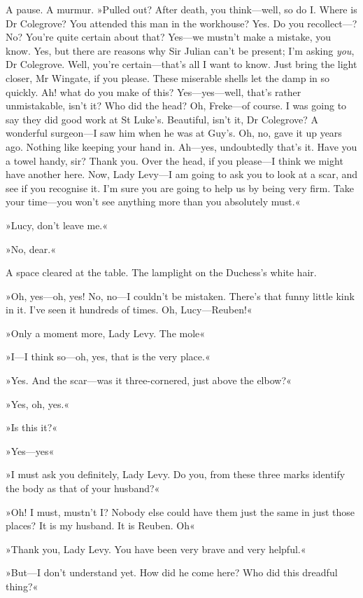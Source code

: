 A pause. A murmur. »Pulled out? After death, you think—well, so do I. Where is Dr Colegrove? You attended this man in the workhouse? Yes. Do you recollect---? No? You're quite certain about that? Yes—we mustn't make a mistake, you know. Yes, but there are reasons why Sir Julian can't be present; I'm asking \textit{you}, Dr Colegrove. Well, you're certain—that's all I want to know. Just bring the light closer, Mr Wingate, if you please. These miserable shells let the damp in so quickly. Ah! what do you make of this? Yes—yes---well, that's rather unmistakable, isn't it? Who did the head? Oh, Freke—of course. I was going to say they did good work at St Luke's. Beautiful, isn't it, Dr Colegrove? A wonderful surgeon—I saw him when he was at Guy's. Oh, no, gave it up years ago. Nothing like keeping your hand in. Ah—yes, undoubtedly that's it. Have you a towel handy, sir? Thank you. Over the head, if you please—I think we might have another here. Now, Lady Levy—I am going to ask you to look at a scar, and see if you recognise it. I'm sure you are going to help us by being very firm. Take your time—you won't see anything more than you absolutely must.«

»Lucy, don't leave me.«

»No, dear.«

A space cleared at the table. The lamplight on the Duchess's white hair.

»Oh, yes—oh, yes! No, no—I couldn't be mistaken. There's that funny little kink in it. I've seen it hundreds of times. Oh, Lucy—Reuben!«

»Only a moment more, Lady Levy. The mole\longdash«

»I—I think so—oh, yes, that is the very place.«

»Yes. And the scar—was it three-cornered, just above the elbow?«

»Yes, oh, yes.«

»Is this it?«

»Yes—yes\longdash«

»I must ask you definitely, Lady Levy. Do you, from these three marks identify the body as that of your husband?«

»Oh! I must, mustn't I? Nobody else could have them just the same in just those places? It is my husband. It is Reuben. Oh\longdash«

»Thank you, Lady Levy. You have been very brave and very helpful.«

»But—I don't understand yet. How did he come here? Who did this dreadful thing?«

